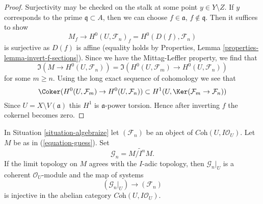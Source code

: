 \begin{proof}
Surjectivity may be checked on the stalk at some point $y \in Y \setminus Z$.
If $y$ corresponds to the prime $\mathfrak q \subset A$, then we can
choose $f \in \mathfrak a$, $f \not \in \mathfrak q$. Then it suffices
to show
$$
M_f \longrightarrow H^0(U, \mathcal{F}_n)_f = H^0(D(f), \mathcal{F}_n)
$$
is surjective as $D(f)$ is affine (equality holds by Properties,
Lemma \ref{properties-lemma-invert-f-sections}). Since we have the
Mittag-Leffler property, we find that
$$
\Im(M \to H^0(U, \mathcal{F}_n)) =
\Im(H^0(U, \mathcal{F}_m) \to H^0(U, \mathcal{F}_n))
$$
for some $m \geq n$. Using the long exact sequence of cohomology we see
that
$$
\Coker(H^0(U, \mathcal{F}_m) \to H^0(U, \mathcal{F}_n))
\subset
H^1(U, \Ker(\mathcal{F}_m \to \mathcal{F}_n))
$$
Since $U = X \setminus V(\mathfrak a)$ this $H^1$ is $\mathfrak a$-power
torsion. Hence after inverting $f$ the cokernel becomes zero.
\end{proof}

\begin{lemma}
\label{lemma-when-topology}
In Situation \ref{situation-algebraize} let $(\mathcal{F}_n)$ be an object
of $\textit{Coh}(U, I\mathcal{O}_U)$. Let $M$ be as in (\ref{equation-guess}).
Set
$$
\mathcal{G}_n = \widetilde{M/I^nM}.
$$
If the limit topology on $M$ agrees with the $I$-adic topology, then
$\mathcal{G}_n|_U$ is a coherent
$\mathcal{O}_U$-module and the map of systems
$$
(\mathcal{G}_n|_U) \longrightarrow (\mathcal{F}_n)
$$
is injective in the abelian category $\textit{Coh}(U, I\mathcal{O}_U)$.
\end{lemma}


